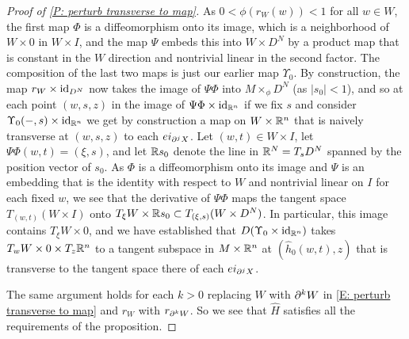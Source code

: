 \begin{proof}[Proof of \cref{P: perturb transverse to map}]
	As $0 < \phi(r_W(w)) < 1$ for all $w \in W$, the first map $\Phi$ is a diffeomorphism onto its image, which is a neighborhood of $W \times 0$ in $W \times I$, and the map $\Psi$ embeds this into $W \times D^N$ by a product map that is constant in the $W$ direction and nontrivial linear in the second factor.
	The composition of the last two maps is just our earlier map $\Upsilon_0$.
	By construction, the map $r_W \times \mathrm{id}_{D^N}$ now takes the image of $\Psi\Phi$ into $M\times_\phi D^N$ (as $|s_0|<1$), and so at each point $(w,s,z)$ in the image of $\Psi\Phi \times \mathrm{id}_{\mathbb{R}^n}$ if we fix $s$ and consider $\Upsilon_0(-,s) \times \mathrm{id}_{\mathbb{R}^n}$ we get by construction a map on $W \times \mathbb{R}^n$ that is naively transverse at $(w,s,z)$ to each $ei_{\partial^j X}$.
	Let $(w,t) \in W \times I$, let $\Psi \Phi(w,t) = (\xi,s)$, and let $\mathbb{R} s_0$ denote the line in $\mathbb{R}^N = T_sD^N$ spanned by the position vector of $s_0$.
	As $\Phi$ is a diffeomorphism onto its image and $\Psi$ is an embedding that is the identity with respect to $W$ and nontrivial linear on $I$ for each fixed $w$, we see
	that the derivative of $\Psi\Phi$ maps the tangent space $T_{(w,t)}(W \times I)$ onto $T_\xi W \times \mathbb{R} s_0 \subset T_{(\xi,s)}(W \times D^N)$.
	In particular, this image contains $T_\xi W \times 0$, and we have established that $D(\Upsilon_0 \times \mathrm{id}_{\mathbb{R}^n})$ takes $T_w W \times 0 \times T_z\mathbb{R}^n$ to a tangent subspace in $M \times \mathbb{R}^n$ at $(\hat h_0(w,t),z)$ that is transverse to the tangent space there of each $ei_{\partial^j X}$.

	The same argument holds for each $k>0$ replacing $W$ with $\partial^{k}W$ in \eqref{E: perturb transverse to map} and $r_W$ with $r_{\partial^k W}$.
	So we see that $\hat H$ satisfies all the requirements of the proposition.
	\qedhere
	\begin{comment}
		But as $\Phi$ is a diffeomorphism onto its image and $\Psi$ is an embedding that is the identity with respect to $X$, we see $\Psi\Phi$ takes a neighborhood of any $(x,t) \in X \times (0,1)$ to a neighborhood of its image in $X \times \R s_0$, where $\R s_0$ is the line in $\R^N$ spanned by $s_0$.
		In particular, the derivative of $\Psi\Phi$ maps the tangent space to $X \times (0,1)$ at $(x,t)$ onto $ T_xX \times \R s_0 \subset T_{\Psi\Phi(x,t)}(X \times D^N)$.
		So for any $(x,t,z) \in X \times (-1,1) \times \R^n$, the image of $T_{(x,t,z)}(X \times (-1,1) \times \R^n)$ under
		$D(\Psi\Phi \times \id_{\R^n})$ contains $T_xX \times 0 \times \R^n$.
		By our construction, $DH_1$ takes this tangent space to a tangent subspace in $M \times \R^n$ at $\hat h(x,t)$ that is transverse to the images of all $D(ei_{\bd^jW})$.
		The same holds for $k>1$ replacing $X$ with $\bd^{k}V$ and $r_X$ with $r_{\bd^{k}V}$.
		So we see that $\hat h$ satisfies all the requirements of the proposition.
	\end{comment}
\end{proof}

